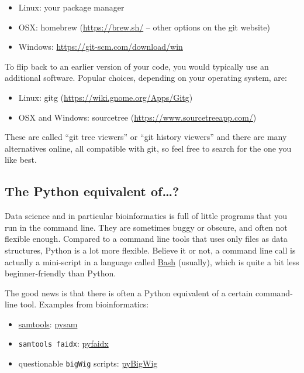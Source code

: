 \documentclass[12pt,a4paper,notitlepage,onecolumn]{article}
\begin{document}
\begin{itemize}
\item Linux: your package manager
\item OSX: homebrew (\url{https://brew.sh/} -- other options on the git website)
\item Windows: \url{https://git-scm.com/download/win}
\end{itemize}

To flip back to an earlier version of your code, you would typically use an additional software. Popular choices, depending on your operating system, are:

\begin{itemize}
\item Linux: gitg (\url{https://wiki.gnome.org/Apps/Gitg})
\item OSX and Windows: sourcetree (\url{https://www.sourcetreeapp.com/})
\end{itemize}

These are called ``git tree viewers'' or ``git history viewers'' and there are many alternatives online, all compatible with git, so feel free to search for the one you like best.

\subsection{The Python equivalent of\dots?}
Data science and in particular bioinformatics is full of little programs that you run in the command line. They are sometimes buggy or obscure, and often not flexible enough. Compared to a command line tools that uses only files as data structures, Python is a lot more flexible. Believe it or not, a command line call is actually a mini-script in a language called \href{https://www.gnu.org/software/bash/}{Bash} (usually), which is quite a bit less beginner-friendly than Python.

The good news is that there is often a Python equivalent of a certain command-line tool. Examples from bioinformatics:

\begin{itemize}
\item \href{https://github.com/samtools/samtools}{samtools}: \href{https://pysam.readthedocs.io/en/latest/}{pysam}
\item \texttt{samtools faidx}: \href{https://github.com/mdshw5/pyfaidx}{pyfaidx}
\item questionable \texttt{bigWig} scripts: \href{http://genome.ucsc.edu/goldenPath/help/bigWig.html}{pyBigWig}
\end{itemize}
\end{document}
